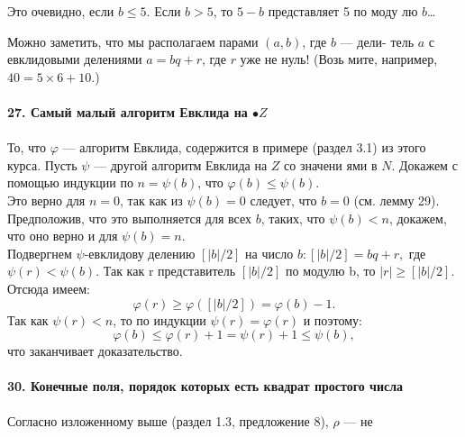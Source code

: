 \documentclass{mai_book}
\begin{document}
\noindent Это очевидно, если $b \leqslant 5$. Если $b > 5$,  то $5 - b$  представляет 5 по моду­\linebreak
лю $b$\ldots

Можно заметить, что мы располагаем парами $(a,b)$, где $b$ --- дели-\linebreak
тель $a$  с евклидовыми делениями $a = bq + r$, где $r$ уже не нуль! (Возь­\linebreak
мите, например, $40 = 5 \times 6 + 10$.)\\
\\
\noindent\textbf{27. Самый малый алгоритм Евклида на $\mathbb{•}{Z}$}\\
\\
\hspace*{15pt}То, что $\varphi$ ---  алгоритм Евклида, содержится в примере (раздел 3.1)\linebreak
из этого курса. Пусть $\psi$ --- другой алгоритм Евклида на $Z$  со значени­\linebreak
ями в $N$. Докажем с помощью индукции по $n =\psi(b)$, что $\varphi(b) \leqslant \psi(b)$.\\
\hspace*{15pt}Это верно для $n = 0$, так как из $\psi(b) = 0$ следует, что $b = 0$\linebreak
(см. лемму 29). Предположив, что это выполняется для всех $b$, таких,\linebreak
что $\psi(b) < n$,  докажем, что оно верно и для $\psi(b) = n$.\\
\hspace*{15pt}Подвергнем $\psi$-евклидову делению $[|b|/2]$ на число $b:[|b|/2] = bq+r,$\linebreak
где $\psi(r) < \psi(b)$. Так как r  представитель $[|b|/2]$ по модулю  b, то \linebreak
$|r| \geqslant [|b|/2]$. Отсюда имеем: 
$$\varphi(r) \geqslant \varphi([|b|/2]) = \varphi(b) - 1.$$
Так как $\psi(r) < n$, то по индукции $\psi(r) = \varphi(r)$ и поэтому:
$$\varphi(b) \leqslant \varphi(r) + 1 = \psi(r) + 1 \leqslant \psi(b),$$
что заканчивает доказательство.\\
\\
\noindent\textbf{30. Конечные поля, порядок которых есть квадрат\linebreak
простого числа}\\
\\
\hspace*{15pt}Согласно изложенному выше (раздел 1.3, предложение 8), $\rho$ --- не­\linebreak
\end{document}
